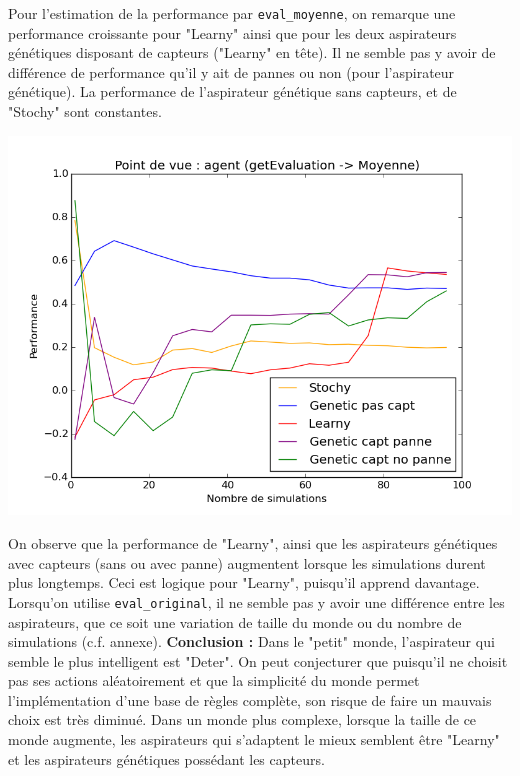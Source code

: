 \documentclass[12pt]{article}
\begin{document}
Pour l'estimation de la performance par \texttt{eval\_moyenne}, on remarque une performance croissante pour "Learny" ainsi que pour les deux aspirateurs génétiques disposant de capteurs ("Learny" en tête). Il ne semble pas y avoir de différence de performance qu'il y ait de pannes ou non (pour l'aspirateur génétique). La performance de l'aspirateur génétique sans capteurs, et de "Stochy" sont constantes.
\begin{center}
\includegraphics[scale=0.5]{simu_geteval_moy_tout}
\end{center}
\justify
On observe que la performance de "Learny", ainsi que les aspirateurs génétiques avec capteurs (sans ou avec panne) augmentent lorsque les simulations durent plus longtemps. Ceci est logique pour "Learny", puisqu'il apprend davantage.
\justify
Lorsqu'on utilise \texttt{eval\_original}, il ne semble pas y avoir une différence entre les aspirateurs, que ce soit une variation de taille du monde ou du nombre de simulations (c.f. annexe).
\justify
\textbf{Conclusion : } Dans le "petit" monde, l'aspirateur qui semble le plus intelligent est "Deter". On peut conjecturer que puisqu'il ne choisit pas ses actions aléatoirement et que la simplicité du monde permet l'implémentation d'une base de règles complète, son risque de faire un mauvais choix est très diminué. Dans un monde plus complexe, lorsque la taille de ce monde augmente, les aspirateurs qui s'adaptent le mieux semblent être "Learny" et les aspirateurs génétiques possédant les capteurs.
\end{document}
